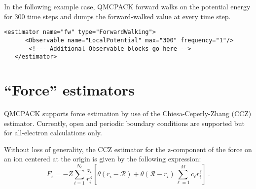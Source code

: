 In the following example case, QMCPACK forward walks on the potential energy for 300 time steps and dumps the forward-walked value at every time step.  

\begin{lstlisting}[style=QMCPXML,caption=Forward-walking estimator element.]
  <estimator name="fw" type="ForwardWalking">
      <Observable name="LocalPotential" max="300" frequency="1"/>
       <!--- Additional Observable blocks go here -->
   </estimator>
\end{lstlisting}






\section{``Force'' estimators} \label{sec:force_est}

QMCPACK supports force estimation by use of the Chiesa-Ceperly-Zhang (CCZ) estimator.  Currently, open and periodic boundary conditions are supported but for all-electron calculations only.  

Without loss of generality, the CCZ estimator for the z-component of the force on an ion centered at the origin is given by the following expression:
\begin{equation}
F_z = -Z \sum_{i=1}^{N_e}\frac{z_i}{r_i^3}[\theta(r_i-\mathcal{R}) + \theta(\mathcal{R}-r_i)\sum_{\ell=1}^{M}c_\ell r_i^\ell]\:.
\end{equation}

